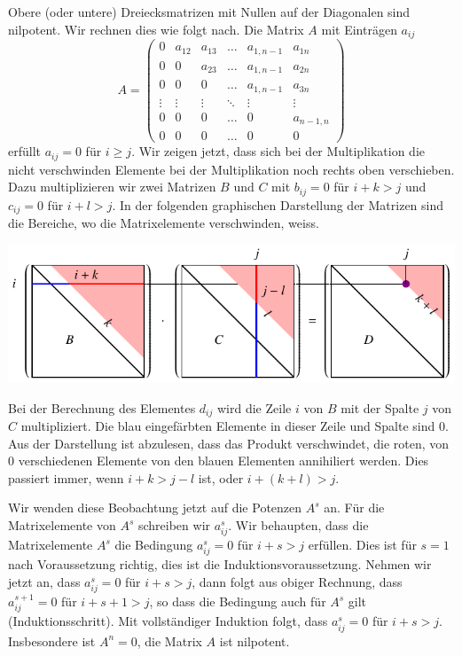 \begin{beispiel}
Obere (oder untere) Dreiecksmatrizen mit Nullen auf der Diagonalen
sind nilpotent.
Wir rechnen dies wie folgt nach.
Die Matrix $A$ mit Einträgen $a_{ij}$
\[
A=\begin{pmatrix}
  0   &a_{12}&a_{13}&\dots &a_{1,n-1}&a_{1n}   \\
  0   &  0   &a_{23}&\dots &a_{1,n-1}&a_{2n}   \\
  0   &  0   &  0   &\dots &a_{1,n-1}&a_{3n}   \\
\vdots&\vdots&\vdots&\ddots&\vdots   &\vdots   \\
  0   &  0   &  0   &\dots &  0      &a_{n-1,n}\\
  0   &  0   &  0   &\dots &  0      &  0
\end{pmatrix}
\]
erfüllt $a_{ij}=0$ für $i\ge j$.
Wir zeigen jetzt, dass sich bei der Multiplikation die nicht
verschwinden Elemente bei der Multiplikation noch rechts oben
verschieben.
Dazu multiplizieren wir zwei Matrizen $B$ und $C$ mit
$b_{ij}=0$ für $i+k>j$ und $c_{ij}=0$ für $i+l>j$.
In der folgenden graphischen Darstellung der Matrizen sind die
Bereiche, wo die Matrixelemente verschwinden, weiss.
\begin{center}
\includegraphics{chapters/40-eigenwerte/images/nilpotent.pdf}
\end{center}
Bei der Berechnung des Elementes $d_{ij}$ wird die Zeile $i$ von $B$
mit der Spalte $j$ von $C$ multipliziert.
Die blau eingefärbten Elemente in dieser Zeile und Spalte sind $0$.
Aus der Darstellung ist abzulesen, dass das Produkt verschwindet, 
die roten, von $0$ verschiedenen Elemente von den blauen Elementen
annihiliert werden.
Dies passiert immer, wenn $i+k>j-l$ ist, oder $i+(k+l)> j$.

Wir wenden diese Beobachtung jetzt auf die Potenzen $A^s$ an.
Für die Matrixelemente von $A^s$ schreiben wir $a^s_{ij}$.
Wir behaupten, dass die Matrixelemente $A^s$ die Bedingung
$a_{ij}^s=0$ für $i+s>j$ erfüllen.
Dies ist für $s=1$ nach Voraussetzung richtig, dies ist die
Induktionsvoraussetzung.
Nehmen wir jetzt an, dass $a_{ij}^s=0$ für $i+s>j$, dann folgt
aus obiger Rechnung, dass $a_{ij}^{s+1}=0$ für $i+s+1>j$, so
dass die Bedingung auch für $A^s$ gilt (Induktionsschritt).
Mit vollständiger Induktion folgt, dass $a_{ij}^s=0$ für $i+s>j$.
Insbesondere ist $A^n=0$, die Matrix $A$ ist nilpotent.
\end{beispiel}

